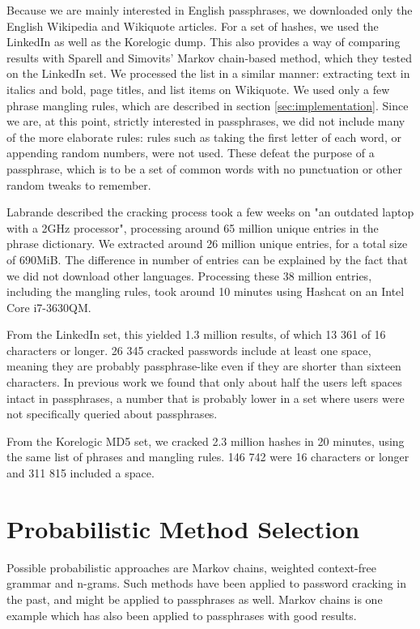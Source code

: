 \documentclass{article}
\begin{document}
Because we are mainly interested in English passphrases, we downloaded only the
English Wikipedia and Wikiquote articles. For a set of hashes, we used the
LinkedIn as well as the Korelogic dump. This also provides a way of comparing
results with Sparell and Simovits'\cite{sparell-simovits} Markov chain-based
method, which they tested on the LinkedIn set. We processed the list in a
similar manner: extracting text in italics and bold, page titles, and list
items on Wikiquote. We used only a few phrase mangling rules, which are
described in section \ref{sec:implementation}. Since we are, at this point,
strictly interested in passphrases, we did not include many of the more
elaborate rules: rules such as taking the first letter of each word, or
appending random numbers, were not used. These defeat the purpose of a
passphrase, which is to be a set of common words with no punctuation or other
random tweaks to remember.

Labrande described the cracking process took a few weeks on "an outdated laptop
with a 2GHz processor", processing around 65 million unique entries in the
phrase dictionary. We extracted around 26 million unique entries, for a total
size of 690MiB. The difference in number of entries can be explained by the
fact that we did not download other languages. Processing these 38 million
entries, including the mangling rules, took around 10 minutes using Hashcat on
an Intel Core i7-3630QM.

From the LinkedIn set, this yielded 1.3 million results, of which 13 361 of 16
characters or longer. 26 345 cracked passwords include at least one space,
meaning they are probably passphrase-like even if they are shorter than sixteen
characters. In previous work\cite{own} we found that only about half the users
left spaces intact in passphrases, a number that is probably lower in a set
where users were not specifically queried about passphrases.

From the Korelogic MD5 set, we cracked 2.3 million hashes in 20 minutes, using
the same list of phrases and mangling rules. 146 742 were 16 characters or
longer and 311 815 included a space.


\section{Probabilistic Method Selection}\label{sec:methods-comparison}

Possible probabilistic approaches are Markov chains, weighted context-free
grammar and n-grams. Such methods have been applied to password cracking in
the past, and might be applied to passphrases as well. Markov chains is one
example which has also been applied to passphrases\cite{sparell-simovits} with
good results.
\end{document}
